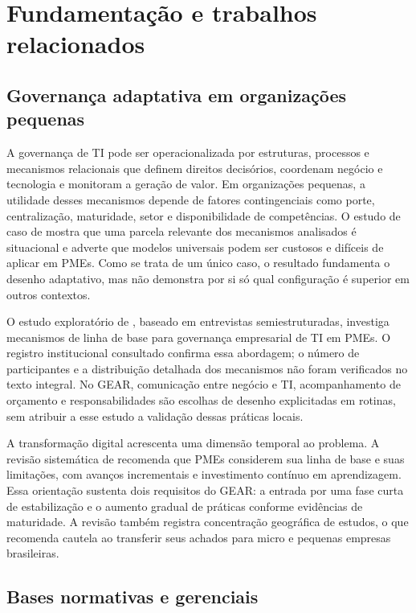 \section{Fundamentação e trabalhos relacionados}
\label{sec:fundamentacao}

\subsection{Governança adaptativa em organizações pequenas}

A governança de TI pode ser operacionalizada por estruturas, processos e mecanismos relacionais que definem direitos decisórios, coordenam negócio e tecnologia e monitoram a geração de valor. Em organizações pequenas, a utilidade desses mecanismos depende de fatores contingenciais como porte, centralização, maturidade, setor e disponibilidade de competências. O estudo de caso de \citet{levstek2022adaptive} mostra que uma parcela relevante dos mecanismos analisados é situacional e adverte que modelos universais podem ser custosos e difíceis de aplicar em PMEs. Como se trata de um único caso, o resultado fundamenta o desenho adaptativo, mas não demonstra por si só qual configuração é superior em outros contextos.

O estudo exploratório de \citet{silva2018baseline}, baseado em entrevistas semiestruturadas, investiga mecanismos de linha de base para governança empresarial de TI em PMEs. O registro institucional consultado confirma essa abordagem; o número de participantes e a distribuição detalhada dos mecanismos não foram verificados no texto integral. No GEAR, comunicação entre negócio e TI, acompanhamento de orçamento e responsabilidades são escolhas de desenho explicitadas em rotinas, sem atribuir a esse estudo a validação dessas práticas locais.

A transformação digital acrescenta uma dimensão temporal ao problema. A revisão sistemática de \citet{sagala2024transformation} recomenda que PMEs considerem sua linha de base e suas limitações, com avanços incrementais e investimento contínuo em aprendizagem. Essa orientação sustenta dois requisitos do GEAR: a entrada por uma fase curta de estabilização e o aumento gradual de práticas conforme evidências de maturidade. A revisão também registra concentração geográfica de estudos, o que recomenda cautela ao transferir seus achados para micro e pequenas empresas brasileiras.

\subsection{Bases normativas e gerenciais}

